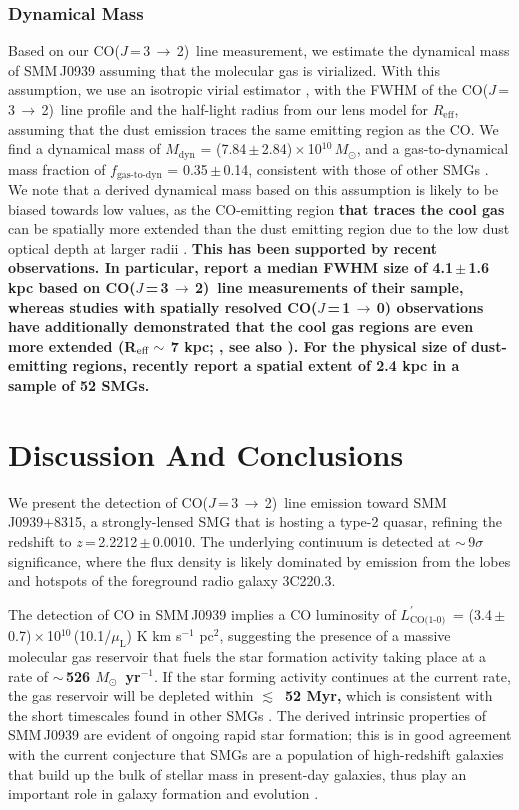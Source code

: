 \documentclass[iop, revtex4]{emulateapj}
\newcommand{\Msun}{\mbox{$M_{\odot}$}}
\newcommand{\rarr}{$\rightarrow$}
\newcommand{\CO}{\mbox{CO($J$\,=\,3\,$\rightarrow$\,2) }}
\newcommand{\rot}[3][CO]{\mbox{#1($J$\,=\,#2\,\rarr\,#3)}}
\newcommand{\Lp}{\mbox{$L^{\prime}_\textrm{CO(1-0)}$}}
\newcommand{\LpU}{\mbox{K\,\,km\,\,s$^{-1}$\,\,pc$^2$}}
\newcommand{\eg}{{\sl e.g.,~}}
\newcommand{\pmOne}{\mbox{$^{-1}$}}
\begin{document}
\subsubsection{Dynamical Mass}
Based on our \CO line measurement, we estimate the dynamical mass of SMM\,J0939 assuming that the molecular gas is virialized. With this assumption, we use an isotropic virial estimator \citep[\eg][]{Engel10a}, with the FWHM of the \CO line profile and the half-light radius from our lens model for $R_\textrm{eff}$, assuming that the dust emission traces the same emitting region as the CO. 
We find a dynamical mass of $M_\textrm{dyn}$ = (7.84\,$\pm$\,2.84)\,$\times$\,10$^{10}$\,\Msun, and a gas-to-dynamical mass fraction of $f_\textrm{gas-to-dyn}$ = 0.35\,$\pm$\,0.14, consistent with those of other SMGs \citep{Tacconi06a}.  We note that a derived dynamical mass based on this assumption is likely to be biased towards low values, as the CO-emitting region {\bf that traces the cool gas} can be spatially more extended than the dust emitting region due to the low dust optical depth at larger radii \citep[\eg][]{Tacconi06a, Riechers11c,Riechers11d,Ivison11a}. 
{\bf This has been supported by recent observations. In particular, \citet{Tacconi06a} report a median FWHM size of 4.1\,$\pm$\,1.6 kpc based on \CO line measurements of their sample, whereas studies with spatially resolved \rot{1}{0} observations have additionally demonstrated that the cool gas regions are even more extended (R$_{\rm eff} \sim$ 7 kpc;  \citealt{Ivison11a}, see also \citealt{Riechers11c, Hodge13a}). 
For the physical size of dust-emitting regions, \citet{Simpson15a} recently report a spatial extent of 2.4 kpc in a sample of 52 SMGs.
 }

\section{Discussion And Conclusions}
We present the detection of \CO line emission toward SMM\,J0939+8315, a strongly-lensed SMG that is hosting a type-2 quasar, refining the redshift
to $z$\,=\,2.2212\,$\pm$\,0.0010. The underlying continuum is detected at $\sim$\,9$\sigma$ significance, where the flux density is likely dominated by emission from the lobes and hotspots of the foreground radio galaxy 3C220.3.

The detection of CO in SMM\,J0939
implies a CO luminosity of \Lp\ = (3.4\,$\pm$\,0.7)\,$\times$\,10$^{10}$\,(10.1/$\mu_\textrm{L}$) \LpU, suggesting the presence of a massive
molecular gas reservoir that fuels the star formation activity taking place at a rate of {\bf $\sim$\,526 \Msun~yr\pmOne}. If the star forming activity continues at the current rate, the gas reservoir will be depleted within {\bf $\lesssim$~52 Myr,}
which is consistent with the short timescales found in other SMGs \citep{Greve05a}. The derived intrinsic properties of SMM\,J0939 are evident of ongoing rapid star formation; this is in good agreement with the current conjecture that SMGs are a 
population of high-redshift galaxies that build up the bulk of stellar mass in present-day galaxies, thus play an important role
in galaxy formation and evolution \citep[\eg ][]{Dickinson03a}.
\end{document}
